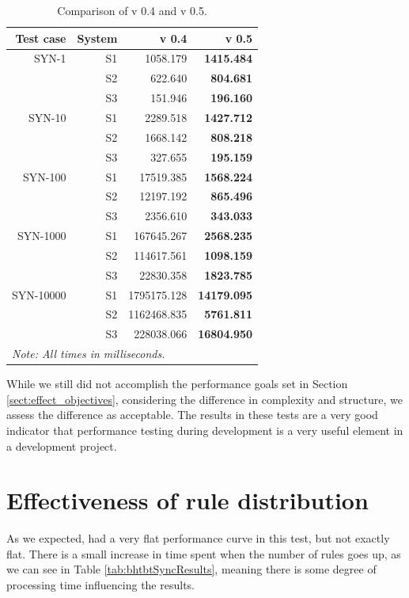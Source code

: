 \begin{table}[h!]
  \centering
  \begin{tabular}{r|r|r|r}
Test case & System & \snowman{} v 0.4 & \snowman{} v 0.5 \\
\hline
SYN-1 & S1 & 1058.179 & \textbf{1415.484}  \\
 & S2 & 622.640 & \textbf{804.681}  \\
 & S3 & 151.946 & \textbf{196.160}  \\
\hline
SYN-10 & S1 & 2289.518 & \textbf{1427.712}  \\
 & S2 & 1668.142 & \textbf{808.218}  \\
 & S3 & 327.655 & \textbf{195.159}  \\
\hline
SYN-100 & S1 & 17519.385 & \textbf{1568.224}  \\
 & S2 & 12197.192 & \textbf{865.496}  \\
 & S3 & 2356.610 & \textbf{343.033}  \\
\hline
SYN-1000 & S1 & 167645.267 & \textbf{2568.235}  \\
 & S2 & 114617.561 & \textbf{1098.159} \\
 & S3 & 22830.358 & \textbf{1823.785}  \\
\hline
SYN-10000 & S1 & 1795175.128 & \textbf{14179.095}  \\
 & S2 & 1162468.835 & \textbf{5761.811}  \\
 & S3 & 228038.066 & \textbf{16804.950}  \\
\hline
\multicolumn{4}{l}{\textit{Note: All times in milliseconds.}}
  \end{tabular}
  \caption{Comparison of \snowman{} v 0.4 and v 0.5.}
  \label{tab:compareversions}
\end{table}

While we still did not accomplish the performance goals set in Section
\ref{sect:effect_objectives}, considering the difference in complexity and structure, we assess the difference as acceptable. The results
in these tests are a very good indicator that performance testing during
development is a very useful element in a development project.

\section{Effectiveness of rule distribution}
As we expected, \bhtb{} had a very flat performance curve in this test, but not
exactly flat. There is a small increase in time spent when the number of rules
goes up, as we can see in Table \ref{tab:bhtbtSyncResults}, meaning there is some degree of
processing time influencing the results. 

